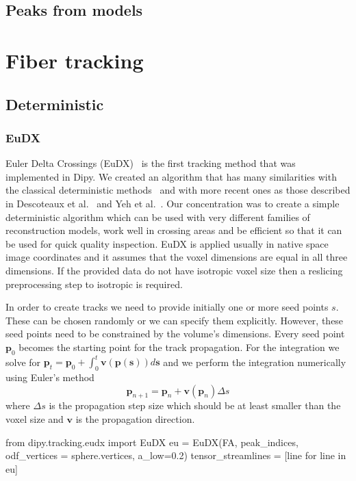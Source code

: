 \documentclass{bioinfo}
\begin{document}
\subsection{Peaks from models}

\section{Fiber tracking}

\subsection{Deterministic}

\subsubsection{EuDX}
Euler Delta Crossings (EuDX)~\citep{Garyfallidis_thesis} is the first tracking method that was implemented in Dipy. We created an algorithm that has many similarities with the classical deterministic methods~\citep{Mori1999, conturo-lori-etal:99, basser-pajevic-etal:00} and with more recent ones as those described in Descoteaux et al.~\citep{descoteaux-deriche-etal:09} and Yeh et al.~\citep{yeh-etal:10}. Our concentration was to create a simple deterministic algorithm which can be used with very different families of reconstruction models, work well in crossing areas and be efficient so that it can be used for quick quality inspection. EuDX is applied usually in native space image coordinates and it assumes that the voxel dimensions are equal in all three dimensions. If the provided data do not have isotropic voxel size then a reslicing preprocessing step to isotropic is required.

In order to create tracks we need to provide initially one or more seed points $s$. These can be chosen randomly or we can specify them explicitly. However, these seed points need to be constrained by the volume's dimensions. Every seed point $\mathbf{p}_{0}$ becomes the starting point for the track propagation. For the integration we solve
for $\mathbf{p}_{t}=\mathbf{p}_{0}+\int_{0}^{t}\mathbf{v}(\mathbf{p}(\mathbf{s}))d\mathbf{s}$ and we perform the integration numerically using Euler's method
\begin{equation}
\mathbf{p}_{n+1}=\mathbf{p}_{n}+\mathbf{v}(\mathbf{p}_{n})\Delta s\label{eq:euler}
\end{equation}
\noindent where $\Delta s$ is the propagation step size which should be at least smaller than the voxel size and $\mathbf{v}$ is the propagation direction.
\begin{python}
from dipy.tracking.eudx import EuDX
eu = EuDX(FA, peak_indices,
          odf_vertices = sphere.vertices,
          a_low=0.2)
tensor_streamlines = [line for line in eu]
\end{python}
\end{document}
